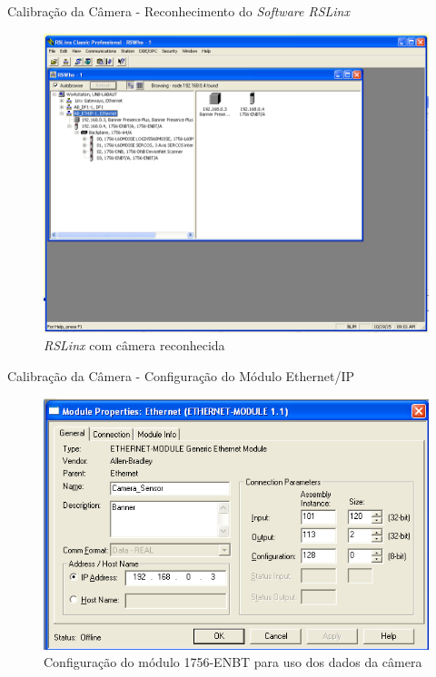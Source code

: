 \documentclass[10pt]{beamer}
\begin{document}
\begin{frame}[fragile]{Calibração da Câmera - Reconhecimento do \textit{Software RSLinx}}
\begin{figure}[!ht]
\centering
\includegraphics[width=.7\linewidth]{figures/resultados/camera/cameralinx}
\caption{\textit{RSLinx} com câmera reconhecida \label{linxcamera}}
\end{figure}
\end{frame}

\begin{frame}[fragile]{Calibração da Câmera - Configuração do Módulo Ethernet/IP}
\begin{figure}[!ht]
\centering
\includegraphics[width=.8\linewidth]{figures/resultados/camera/cameraSetup}
\caption{Configuração do módulo 1756-ENBT para uso dos dados da câmera\label{setupcamera}}
\end{figure}
\end{frame}
\end{document}
